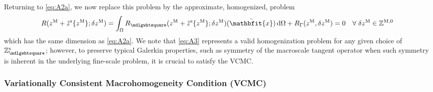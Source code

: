 \documentclass[12pt,a4paper]{article}
\renewcommand{\ta}[1]{\mathbfit{#1}}
\renewcommand{\Box}{\mdlgwhtsquare}
\begin{document}
Returning to \eqref{eq:A2a}, we now replace this problem by the approximate, homogenized, problem
\begin{align}
\label{eq:A3} R(z^\macro+\tilde{z}^\fluct\{z^\macro\};\delta z^\macro) = \int_\Omega R_\Box(z^\macro+\tilde{z}^\fluct\{z^\macro\};\delta z^\macro)(\bar{\ta x})\dif\Omega
 + R_\Gamma(z^\macro, \delta z^\macro) = 0 \quad \forall\;\delta z^\macro \in \set Z^{\macro,0}
\end{align}
which has the same dimension as \eqref{eq:A2a}.
We note that \eqref{eq:A3} represents a valid homogenization problem for any given choice of $\set{Z}_\Box^{\fluct}$; however, to preserve typical Galerkin properties, such as symmetry of the macroscale tangent operator when such symmetry is inherent in the underlying fine-scale problem, it is crucial to satisfy the VCMC.

\subsubsection{Variationally Consistent Macrohomogeneity Condition (VCMC)}
\end{document}
